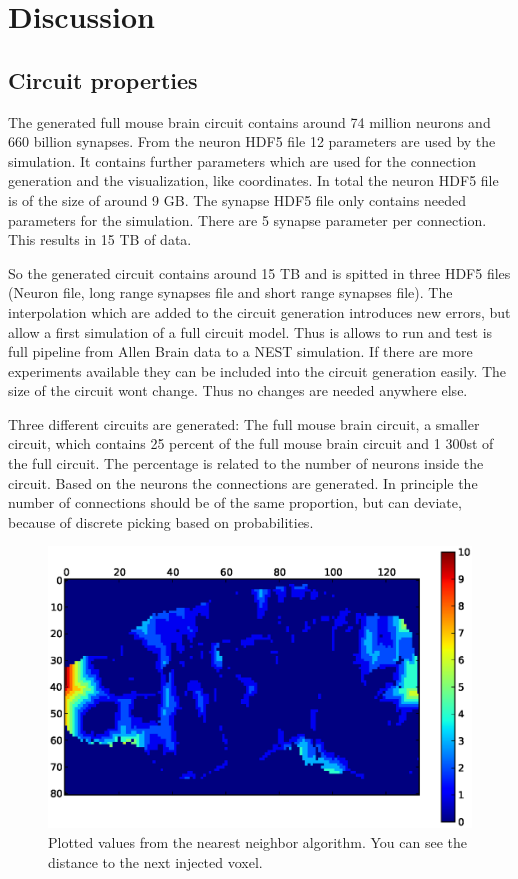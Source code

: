 %

\chapter{Discussion}

\section{Circuit properties}


The generated full mouse brain circuit contains around 74 million neurons and 660 billion synapses.
From the neuron HDF5 file 12 parameters are used by the simulation.
It contains further parameters which are used for the connection generation and the visualization,
like coordinates. In total the neuron HDF5 file is of the size of around 9 GB.
The synapse HDF5 file only contains needed parameters for the simulation.
There are 5 synapse parameter per connection. This results in 15 TB of data.

So the generated circuit contains around 15 TB and is spitted in three HDF5 files (Neuron file, long range synapses file and short range synapses file). The interpolation which are added to the circuit generation introduces new errors, but allow
a first simulation of a full circuit model. Thus is allows to run and test is full pipeline from Allen Brain data to a NEST simulation. If there are more experiments available they can be included into
the circuit generation easily. The size of the circuit wont change. Thus no changes are needed anywhere else.

Three different circuits are generated: The full mouse brain circuit,
a smaller circuit, which contains 25 percent of the full mouse brain circuit and
1 300st of the full circuit. The percentage is related to the number of neurons inside
the circuit. Based on the neurons the connections are generated. In principle the
number of connections should be of the same proportion, but can deviate, because of 
discrete picking based on probabilities.

\begin{figure}[ht!]
\centering
\includegraphics[scale=0.5]{pictures/distance_x_y_70.eps}
\caption{Plotted values from the nearest neighbor algorithm. You can see the distance to the next injected voxel.}
\label{interpolationdistance}
\end{figure}

